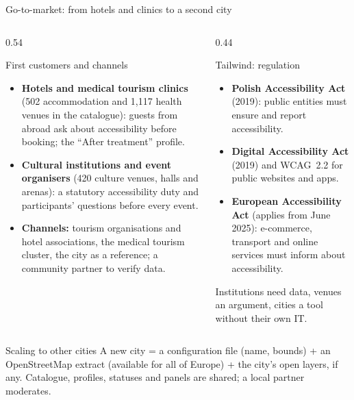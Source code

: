 \begin{frame}{Go-to-market: from hotels and clinics to a second city}
  \begin{columns}[T,onlytextwidth]
    \begin{column}{0.54\textwidth}
      \begin{block}{First customers and channels}
        \footnotesize
        \begin{itemize}
          \item \textbf{Hotels and medical tourism clinics} (502 accommodation and 1,117 health venues in the catalogue):
                guests from abroad ask about accessibility before booking; the “After treatment” profile.
          \item \textbf{Cultural institutions and event organisers} (420 culture venues, halls and arenas):
                a statutory accessibility duty and participants' questions before every event.
          \item \textbf{Channels:} tourism organisations and hotel associations, the medical tourism cluster,
                the city as a reference; a community partner to verify data.
        \end{itemize}
      \end{block}
    \end{column}
    \begin{column}{0.44\textwidth}
      \begin{alertblock}{Tailwind: regulation}
        \footnotesize
        \begin{itemize}
          \item \textbf{Polish Accessibility Act} (2019): public entities must ensure and report accessibility.
          \item \textbf{Digital Accessibility Act} (2019) and WCAG~2.2 for public websites and apps.
          \item \textbf{European Accessibility Act} (applies from June 2025): e-commerce, transport and online services
                must inform about accessibility.
        \end{itemize}
        \vspace{0.3mm}
        Institutions need data, venues an argument, cities a tool without their own IT.
      \end{alertblock}
    \end{column}
  \end{columns}
  \vspace{1mm}
  \begin{exampleblock}{Scaling to other cities}
    \footnotesize
    A new city = a configuration file (name, bounds) + an OpenStreetMap extract (available for all of Europe) + the city's open layers, if any.
    Catalogue, profiles, statuses and panels are shared; a local partner moderates.
  \end{exampleblock}


\end{frame}
